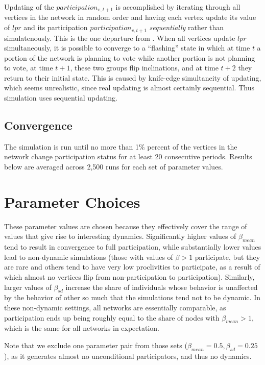 \documentclass[12pt]{article}
\begin{document}
\begin{appendix}
Updating of the $participation_{v, t+1}$ is accomplished by iterating through all vertices in the network in random order and having each vertex update its value of $lpr$ and its participation $participation_{v, t+1}$ \emph{sequentially} rather than simulatenously. This is the one departure from \cite{Siegel:2009vi}. When all vertices update $lpr$ simultaneously, it is possible to converge to a ``flashing'' state in which at time $t$ a portion of the network is planning to vote while another portion is not planning to vote, at time $t+1$, these two groups flip inclinations, and at time $t+2$ they return to their initial state. This is caused by knife-edge simultaneity of updating, which seems unrealistic, since real updating is almost certainly sequential.  Thus simulation uses sequential updating.

\subsection{Convergence}

The simulation is run until no more than 1\% percent of the vertices in the network change participation status for at least 20 consecutive periods. Results below are averaged across 2,500 runs for each set of parameter values.


\section{Parameter Choices}\label{appendix_parameter_choices}

These parameter values are chosen because they effectively cover the range of values that give rise to interesting dynamics. Significantly higher values of $\beta_{mean}$ tend to result in convergence to full participation, while substantially lower values lead to non-dynamic simulations (those with values of $ \beta > 1$ participate, but they are rare and others tend to have very low proclivities to participate, as a result of which almost no vertices flip from non-participation to participation). Similarly, larger values of $\beta_{sd}$ increase the share of individuals whose behavior is unaffected by the behavior of other so much that the simulations tend not to be dynamic. In these non-dynamic settings, all networks are essentially comparable, as participation ends up being roughly equal to the share of nodes with $\beta_{mean} > 1$, which is the same for all networks in expectation.

Note that we exclude one parameter pair from those sets ($\beta_{mean}=0.5, \beta_{sd}=0.25$), as it generates almost no unconditional participators, and thus no dynamics.



\end{appendix}
\end{document}
